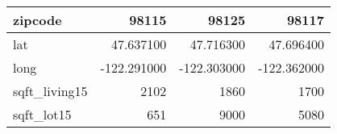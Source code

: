 \begin{table}[H]
\begin{tabular}{|l|r|r|r|}
\hline zipcode & \cellcolor[rgb]{0.9, 0.54, 0.52} 98115 & 98125 & 98117 \\
\hline lat & \cellcolor[rgb]{0.9, 0.54, 0.52} 47.637100 & 47.716300 & 47.696400 \\
\hline long & \cellcolor[rgb]{0.9, 0.54, 0.52} -122.291000 & \cellcolor[rgb]{0.9, 0.54, 0.52} -122.303000 & \cellcolor[rgb]{0.9, 0.54, 0.52} -122.362000 \\
\hline sqft\_living15 & \cellcolor[rgb]{0.9, 0.54, 0.52} 2102 & 1860 & 1700 \\
\hline sqft\_lot15 & \cellcolor[rgb]{0.9, 0.54, 0.52} 651 & 9000 & 5080 \\
\hline
\end{tabular}
\end{table}
